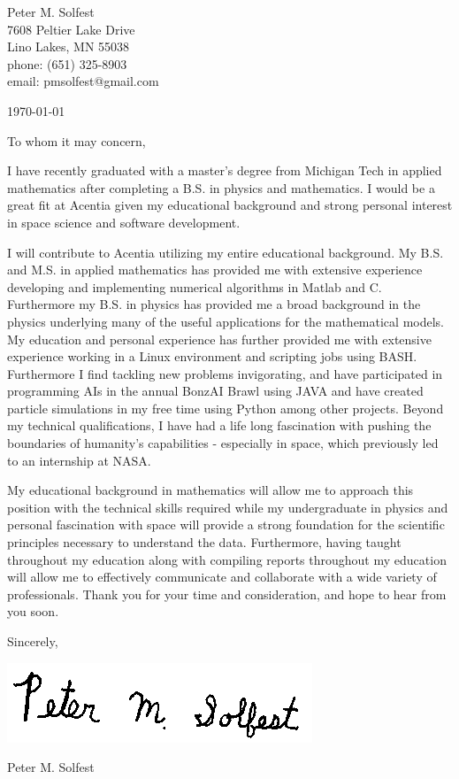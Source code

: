 \documentclass[letterpaper,12pt]{article}
\begin{document}
Peter M. Solfest\\
7608 Peltier Lake Drive\\
Lino Lakes, MN 55038\\
phone: (651) 325-8903\\
email: pmsolfest@gmail.com

\today

To whom it may concern,

I have recently graduated with a master's degree from Michigan Tech in applied mathematics after
completing a B.S. in physics and mathematics.
I would be a great fit at Acentia given my educational background
and strong personal interest in space science and software development.

I will contribute to Acentia utilizing my entire educational background.
My B.S. and M.S. in applied mathematics has provided me with extensive experience developing
and implementing numerical algorithms in Matlab and C.
Furthermore my B.S. in physics has provided me a broad background in the physics
underlying many of the useful applications for the mathematical models.
My education and personal experience has further provided me with
extensive experience working in a Linux environment and scripting
jobs using BASH.
Furthermore I find tackling new problems invigorating, and have
participated in programming AIs in the annual BonzAI Brawl using JAVA and
have created particle simulations in my free time using Python among
other projects.
Beyond my technical qualifications, I have had a life long fascination with
pushing the boundaries of humanity's capabilities - especially in space, which
previously led to an internship at NASA.

My educational background in mathematics will allow 
me to approach this position with the technical skills required
while my undergraduate in physics and personal fascination with space
will provide a strong foundation for the scientific principles necessary
to understand the data.
Furthermore, having taught throughout my education along with compiling reports
throughout my education will allow me to effectively communicate and
collaborate with a wide variety of professionals.
Thank you for your time and consideration, and hope to hear from you soon.


Sincerely,

\includegraphics[height=.5in]{signature.png}

Peter M. Solfest
\end{document}
